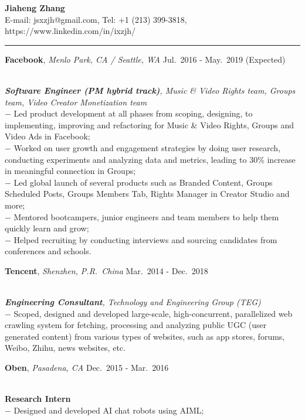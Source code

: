 \documentclass[a4paper,10pt]{article}
\newcommand{\shadedsection}[1]{
    \setlength{\fboxsep}{0pt}
    \colorbox{shadecolor}{%
        \begin{minipage}{\linewidth}%
            \vspace{0.2em}%
            #1%
        \end{minipage}%
    }
}
\newenvironment{rSection}[1]{ %
  \medskip
  \hspace{-1.5em}{\color{Blue}\MakeUppercase{\large \bf {#1}}} %
  \vspace{-0.2em}
  \medskip
  \hrule %
  \begin{list}{}{ %
    \setlength{\leftmargin}{1.5em} %
  }
\setlength{\itemsep}{1pt}
  \item[]
}{
  \end{list}
}
\newcommand{\detail}[1]{{$-$ {#1}}}
\newcommand{\period}[3]{\normalsize {#1} \hfill {#2} - {#3}}
\begin{document}
\begin{center}
  {\huge \bf \color{Blue} Jiaheng Zhang}\\
  \medskip
  {E-mail: jsxzjh@gmail.com, Tel: +1 (213) 399-3818, https://www.linkedin.com/in/ixzjh/}
\end{center}

\begin{rSection}{Experience}
  \vspace{-1.5em}
  \item
    \shadedsection{\period{{\bf Facebook}, {\em Menlo Park, CA / Seattle, WA}}{Jul.~2016}{May.~2019 (Expected)}}\\
    {\em {\bf Software Engineer (PM hybrid track)}, Music \& Video Rights team, Groups team, Video Creator Monetization team}\\
    \detail{Led product development at all phases from scoping, designing, to implementing, improving and refactoring for Music \& Video Rights, Groups and Video Ads in Facebook;}\\
    \detail{Worked on user growth and engagement strategies by doing user research, conducting experiments and analyzing data and metrics, leading to 30\% increase in meaningful connection in Groups;}\\
    \detail{Led global launch of several products such as Branded Content, Groups Scheduled Posts, Groups Members Tab, Rights Manager in Creator Studio and more;}\\
    \detail{Mentored bootcampers, junior engineers and team members to help them quickly learn and grow;}\\
    \detail{Helped recruiting by conducting interviews and sourcing candidates from conferences and schools.}
  \item
    \shadedsection{\period{{\bf Tencent}, {\em Shenzhen, P.R.~China}}{Mar.~2014}{Dec.~2018}}\\
    {\em {\bf Engineering Consultant}, Technology and Engineering Group (TEG)}\\
    \detail{Scoped, designed and developed large-scale, high-concurrent, parallelized web crawling system for fetching, processing and analyzing public UGC (user generated content) from various types of websites, such as app stores, forums, Weibo, Zhihu, news websites, etc.}
  \item
    \shadedsection{\period{{\bf Oben}, {\em Pasadena, CA}}{Dec.~2015}{Mar.~2016}}\\
    {\bf Research Intern}\\
    \detail{Designed and developed AI chat robots using AIML;}\\

\end{rSection}
\end{document}
